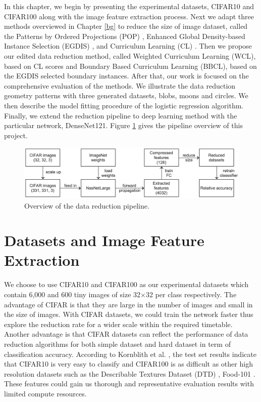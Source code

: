 In this chapter, we begin by presenting the experimental datasets, CIFAR10 and CIFAR100 along with the image feature extraction process. Next we adapt three methods overviewed in Chapter \ref{bg} to reduce the size of image dataset, called the Patterns by Ordered Projections (POP) \cite{Riquelme2003a}, Enhanced Global Density-based Instance Selection (EGDIS) \cite{Malhat2020}, and Curriculum Learning (CL) \cite{Hacohen2019a}. Then we propose our edited data reduction method, called Weighted Curriculum Learning (WCL), based on CL scores and Boundary Based Curriculum Learning (BBCL), based on the EGDIS selected boundary instances. After that, our work is focused on the comprehensive evaluation of the methods. We illustrate the data reduction geometry patterns with three generated datasets, blobs, moons and circles. We then describe the model fitting procedure of the logistic regression algorithm. Finally, we extend the reduction pipeline to deep learning method with the particular network, DenseNet121. Figure \ref{Fig.reduction_pip} gives the pipeline overview of this project.  

 \begin{figure}[H]
 \centering
 \includegraphics[width=1\textwidth]{src/pipeline.png}
 \caption{Overview of the data reduction pipeline.}
 \label{Fig.reduction_pip}
 \end{figure}

\section{Datasets and Image Feature Extraction}
We choose to use CIFAR10 and CIFAR100 \cite{Krizhevsky2009} as our experimental datasets which contain 6,000 and 600 tiny images of size 32$\times$32 per class respectively. The advantage of CIFAR is that they are large in the number of images and small in the size of images. With CIFAR datasets, we could train the network faster thus explore the reduction rate for a wider scale within the required timetable. Another advantage is that CIFAR datasets can reflect the performance of data reduction algorithms for both simple dataset and hard dataset in term of classification accuracy. According to Kornblith et al. \cite{Kornblith2018}, the test set results indicate that CIFAR10 is very easy to classify and CIFAR100 is as difficult as other high resolution datasets such as the Describable Textures Dataset (DTD) \cite{Cimpoi2014}, Food-101 \cite{Bossard2014}. These features could gain us thorough and representative evaluation results with limited compute resources.

